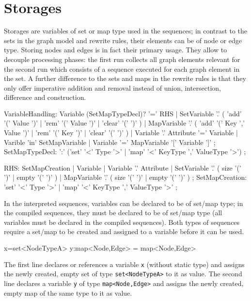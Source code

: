  
\section{Storages}

Storages are variables of set or map type used in the sequences;
in contrast to the sets in the graph model and rewrite rules, their elements can be of node or edge type. 
Storing nodes and edges is in fact their primary usage. 
They allow to decouple processing phases: the first run collects all graph elements relevant for the second run which consists of a sequence executed for each graph element in the set.
A further difference to the sets and maps in the rewrite rules is that they only offer imperative addition and removal instead of union, intersection, difference and construction.
 
\begin{rail}
  VariableHandling: 
    Variable (SetMapTypeDecl)? '=' RHS |
    SetVariable '.' ( 'add' '(' Value ')' | 'rem' '(' Value ')' | 'clear' '(' ')' ) |
    MapVariable '.' ( 'add' '(' Key ',' Value ')' | 'rem' '(' Key ')' | 'clear' '(' ')' ) |
	Variable '.' Attribute '=' Variable |
	Varible 'in' SetMapVariable |
	Variable '=' MapVariable '[' Variable ']'
    ;
  SetMapTypeDecl: 
    ':' ('set' '<' Type '>' | 'map' '<' KeyType ',' ValueType '>')
    ;
\end{rail}\makeatother

\begin{rail}
  RHS:
    SetMapCreation |
	Variable |
	Variable '.' Attribute |
    SetVariable '.' ( size '(' ')' | empty '(' ')' ) |
    MapVariable '.' ( size '(' ')' | empty '(' ')' )
    ;
  SetMapCreation:
	'set' '<' Type '>' |
    'map' '<' KeyType ',' ValueType '>' 
	;
\end{rail}\makeatother

In the interpreted sequences, variables can be declared to be of set/map type;
in the compiled sequences, they must be declared to be of set/map type (all variables must be declared in the compiled sequences).
Both types of sequences require a set/map to be created and assigned to a variable before it can be used.

\begin{example}
\begin{grgen}
x=set<NodeTypeA>
y:map<Node,Edge> = map<Node,Edge>
\end{grgen}
The first line declares or references a variable \texttt{x} (without static type) and assigns the newly created, empty set of type \texttt{set<NodeTypeA>} to it as value.
The second line declares a variable \texttt{y} of type \texttt{map<Node,Edge>} and assigns the newly created, empty map of the same type to it as value.
\end{example}

